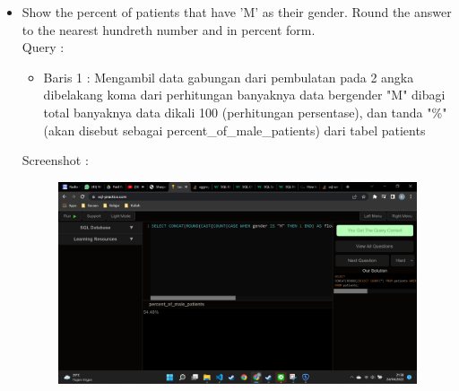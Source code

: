 \documentclass[]{article}
\begin{document}
\begin{itemize}
        \item Show the percent of patients that have 'M' as their gender. Round the answer to the nearest hundreth number and in percent form.
        \\Query :
        
        \begin{itemize}
            \item Baris 1 : Mengambil data gabungan dari pembulatan pada 2 angka dibelakang koma dari perhitungan banyaknya data bergender "M" dibagi total banyaknya data dikali 100 (perhitungan persentase), dan tanda "\%" (akan disebut sebagai percent\_of\_male\_patients) dari tabel patients
        \end{itemize}
        \pagebreak
        Screenshot :
        \begin{figure}[h]
            \includegraphics[scale=0.3]{./Screenshot/Hard-8.png}
            \centering
        \end{figure}

    \end{itemize}
\end{document}
